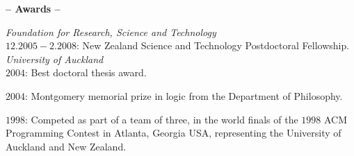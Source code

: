 \documentclass[a4paper]{article}
\def\tit#1{\medskip \begin{center}  {\Large {\bf -- #1 -- }} \end{center}}
\begin{document}

\tit{Awards}

{\em Foundation for Research, Science and Technology}\\ 
$12.2005-2.2008$: New Zealand Science and Technology Postdoctoral Fellowship.\\ 

{\em University of Auckland}\\
$2004$: Best doctoral thesis award.

$2004$: Montgomery memorial prize in logic from the Department of Philosophy.



%

\iffalse

$1998$ and $1999$: Summer Scholarships from the Mathematics Department
 for vacational study and research.\\
\fi


$1998$: Competed as part of a team of three, in the world finals of the $1998$
ACM Programming Contest in Atlanta, Georgia USA, representing the University of Auckland
and New Zealand. 
\end{document}
